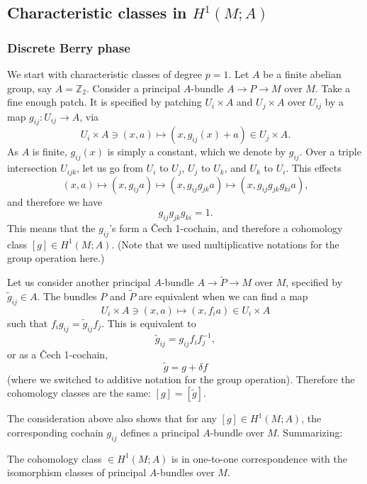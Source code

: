 \documentclass[12pt]{article}
\numberwithin{equation}{section}
\numberwithin{figure}{section}
\theoremstyle{remark}
\def\bZ{\mathbb{Z}}
\begin{document}
\subsection{Characteristic classes in $H^1(M;A)$}

\subsubsection{Discrete Berry phase}
We start with characteristic classes of degree $p=1$.
Let $A$ be a finite abelian group, say $A=\bZ_2$.
Consider a principal $A$-bundle $A\to P\to M$ over $M$.
Take a fine enough patch.
It is specified by patching $U_i\times A$ and $U_j\times A$ over $U_{ij}$ by a map $g_{ij}:U_{ij}\to A$, via \begin{equation}
   U_i\times A\ni (x,a) \mapsto (x,g_{ij}(x)+a)\in U_j\times A.
\end{equation} 
As $A$ is finite, $g_{ij}(x)$ is simply a constant, which we denote by $g_{ij}$.
Over a triple intersection $U_{ijk}$, let us
go from $U_i$ to $U_j$, $U_j$ to $U_k$, and $U_k$ to $U_i$. This effects
\begin{equation}
(x,a) \mapsto (x,g_{ij}a)\mapsto (x,g_{ij}g_{jk}a)\mapsto (x,g_{ij} g_{jk}g_{ki}a),
\end{equation} and therefore we have \begin{equation}
  g_{ij}g_{jk}g_{ki}=1.
\end{equation}
This means that the $g_{ij}$'s form a \v Cech 1-cochain, and therefore a cohomology class $[g] \in H^1(M;A)$.
(Note that we used multiplicative notations for the group operation here.)

Let us consider another principal $A$-bundle $A\to \tilde P\to M$ over $M$,
specified by $\tilde g_{ij}\in A$.
The bundles $P$ and $\tilde P$ are equivalent when we can find a map
\begin{equation}
  U_i\times A \ni (x,a) \mapsto (x,f_i a)\in U_i\times A
\end{equation}
such that $f_i g_{ij}= \tilde g_{ij} f_j$.
This is equivalent to \begin{equation}
\tilde g_{ij} = g_{ij} f_i f_j^{-1}, 
\end{equation} or as a \v Cech 1-cochain, \begin{equation}
\tilde g = g + \delta f
\end{equation} (where we switched to additive notation for the group operation).
Therefore the cohomology classes are the same: $[g]=[\tilde g]$.

The consideration above also shows that for any $[g]\in H^1(M;A)$,
the corresponding cochain $g_{ij}$ defines a principal $A$-bundle over $M$.
Summarizing:
\begin{proposition}
  The cohomology class $\in H^1(M;A)$ is in one-to-one correspondence with the isomorphism classes of principal $A$-bundles over $M$.
\end{proposition}
\end{document}
